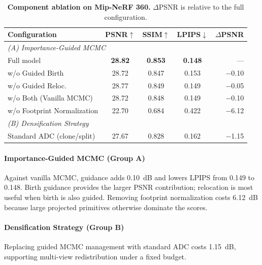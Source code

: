 \documentclass[sigconf]{acmart}
\begin{document}
\begin{table}[t]
    \centering
    \scriptsize
    \setlength\tabcolsep{1.5pt}
    \renewcommand{\arraystretch}{0.95}
    \caption{
        \textbf{Component ablation on Mip-NeRF 360.} $\Delta$PSNR is relative to the full configuration.
    }
    \begin{tabular}{l ccc r}
        \toprule
        Configuration & PSNR$\uparrow$ & SSIM$\uparrow$ & LPIPS$\downarrow$ & $\Delta$PSNR \\
        \midrule
        \multicolumn{5}{l}{\textit{(A) Importance-Guided MCMC}} \\
        \quad Full model & \textbf{28.82} & \textbf{0.853} & \textbf{0.148} & --- \\
        \quad w/o Guided Birth & 28.72 & 0.847 & 0.153 & $-$0.10 \\
        \quad w/o Guided Reloc. & 28.77 & 0.849 & 0.149 & $-$0.05 \\
        \quad w/o Both (Vanilla MCMC) & 28.72 & 0.848 & 0.149 & $-$0.10 \\
        \quad w/o Footprint Normalization & 22.70 & 0.684 & 0.422 & $-$6.12 \\
        \midrule
        \multicolumn{5}{l}{\textit{(B) Densification Strategy}} \\
        \quad Standard ADC (clone/split) & 27.67 & 0.828 & 0.162 & $-$1.15 \\
        \bottomrule
    \end{tabular}
    \label{tab:ablation}
\end{table}

\paragraph{Importance-Guided MCMC (Group A)}
Against vanilla MCMC, guidance adds 0.10~dB and lowers LPIPS from 0.149 to 0.148. Birth guidance provides the larger PSNR contribution; relocation is most useful when birth is also guided. Removing footprint normalization costs 6.12~dB because large projected primitives otherwise dominate the scores.

\paragraph{Densification Strategy (Group B)}
Replacing guided MCMC management with standard ADC costs 1.15~dB, supporting multi-view redistribution under a fixed budget.
\end{document}
